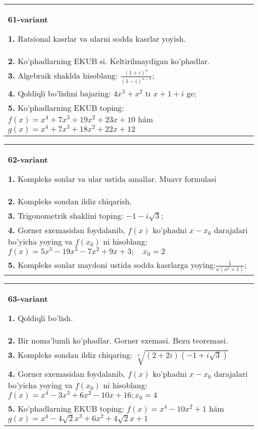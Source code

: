 \documentclass{article}
\begin{document}
\begin{tabular}{m{17cm}}
\textbf{61-variant}
\newline

\textbf{1.} Ratsional kasrlar va ularni sodda kasrlar yoyish. \\
\textbf{2.} Ko’phadlarning EKUB si. Keltirilmaydigan ko’phadlar. \\
\textbf{3.} Algebraik shaklda hisoblang: $\frac{(1+i)^n}{(1-i)^{n-2}}$; \\
\textbf{4.} Qoldiqli bo’lishni bajaring: $4 x^3+x^2$ tı $x+1+i$ ge; \\
\textbf{5.} Ko’phadlarning EKUB toping:  $f(x)=x^4+7 x^3+19 x^2+23 x+10$ hám $g(x)=x^4+7 x^3+18 x^2+22 x+12$ \\

\end{tabular}
\vspace{1cm}


\begin{tabular}{m{17cm}}
\textbf{62-variant}
\newline

\textbf{1.} Kompleks sonlar va ular ustida amallar. Muavr formulasi  \\
\textbf{2.} Kompleks sondan ildiz chiqarish. \\
\textbf{3.} Trigonometrik shaklini toping: $-1-i \sqrt{3}$; \\
\textbf{4.} Gorner sxemasidan foydalanib, $f(x)$ ko’phadni $x-x_0$ darajalari bo’yicha yoying va $f\left(x_0\right)$ ni hisoblang: $f(x)=5 x^5-19 x^3-7 x^2+9 x+3 ; \quad x_0=2$ \\
\textbf{5.} Kompleks sonlar maydoni ustida sodda kasrlarga yoying:$\frac{1}{x\left(x^2+1\right)}$; \\

\end{tabular}
\vspace{1cm}


\begin{tabular}{m{17cm}}
\textbf{63-variant}
\newline

\textbf{1.} Qoldiqli bo’lish.  \\
\textbf{2.} Bir noma’lumli ko’phadlar. Gorner sxemasi. Bezu teoremasi.  \\
\textbf{3.} Kompleks sondan ildiz chiqaring: $\sqrt[4]{(2+2 i)(-1+i \sqrt{3})}$ \\
\textbf{4.} Gorner sxemasidan foydalanib, $f(x)$ ko’phadni $x-x_0$ darajalari bo’yicha yoying va $f\left(x_0\right)$ ni hisoblang: $f(x)=x^4-3 x^3+6 x^2-10 x+16 ; x_0=4$ \\
\textbf{5.} Ko’phadlarning EKUB toping:  $f(x)=x^4-10 x^2+1$ hám $g(x)=x^4-4 \sqrt{2} x^3+6 x^2+4 \sqrt{2} x+1$ \\

\end{tabular}
\vspace{1cm}
\end{document}
